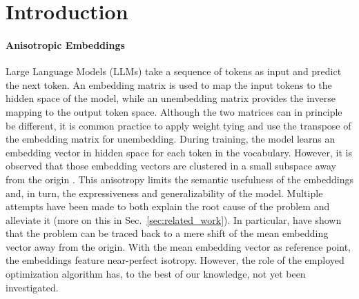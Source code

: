 \section{Introduction}
\paragraph{Anisotropic Embeddings}
Large Language Models (LLMs) take a sequence of tokens as input and predict the next token. An embedding matrix is used to map the input tokens to the hidden space of the model, while an unembedding matrix provides the inverse mapping to the output token space. Although the two matrices can in principle be different, it is common practice to apply weight tying \cite{press-wolf-2017-using} and use the transpose of the embedding matrix for unembedding. 
During training, the model learns an embedding vector in hidden space for each token in the vocabulary. However, it is observed that those embedding vectors are clustered in a small subspace away from the origin \cite{gao2019representationdegenerationproblemtraining}. 
This anisotropy limits the semantic usefulness of the embeddings and, in turn, the expressiveness and generalizability of the model.
Multiple attempts have been made to both explain the root cause of the problem and alleviate it (more on this in Sec.~\ref{sec:related_work}). 
In particular, \citet{bis2021tmic} have shown that the problem can be traced back to a mere shift of the mean embedding vector away from the origin. With the mean embedding vector as reference point, the embeddings feature near-perfect isotropy.
However, the role of the employed optimization algorithm has, to the best of our knowledge, not yet been investigated. 


